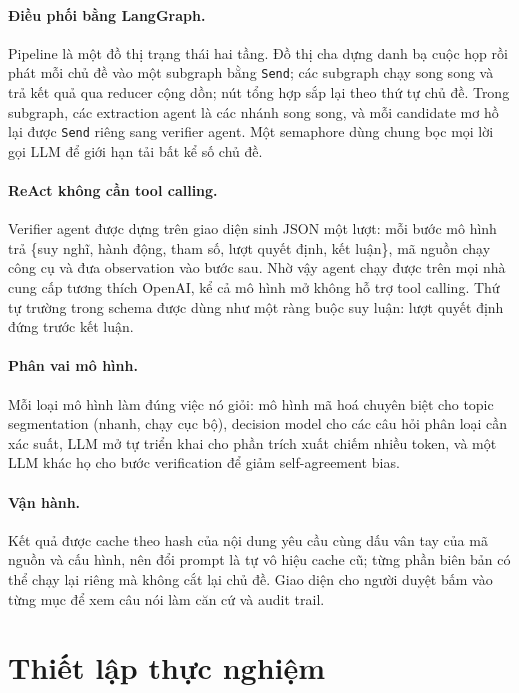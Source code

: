 \documentclass[11pt]{article}
\newcommand{\code}[1]{{\fontencoding{T1}\selectfont\texttt{#1}}}
\begin{document}
\paragraph{Điều phối bằng LangGraph.} Pipeline là một đồ thị trạng thái hai tầng. Đồ thị cha dựng danh
bạ cuộc họp rồi phát mỗi chủ đề vào một subgraph bằng \code{Send}; các subgraph chạy song song và trả
kết quả qua reducer cộng dồn; nút tổng hợp sắp lại theo thứ tự chủ đề. Trong subgraph, các extraction agent là các nhánh song song, và mỗi candidate mơ hồ lại được \code{Send} riêng sang verifier agent.
Một semaphore dùng chung bọc mọi lời gọi LLM để giới hạn tải bất kể số chủ đề.

\paragraph{ReAct không cần tool calling.} Verifier agent được dựng trên giao diện sinh JSON một lượt:
mỗi bước mô hình trả \{suy nghĩ, hành động, tham số, lượt quyết định, kết luận\}, mã nguồn chạy công cụ và
đưa observation vào bước sau. Nhờ vậy agent chạy được trên mọi nhà cung cấp tương thích OpenAI, kể cả
mô hình mở không hỗ trợ tool calling. Thứ tự trường trong schema được dùng như một ràng buộc suy luận:
lượt quyết định đứng trước kết luận.

\paragraph{Phân vai mô hình.} Mỗi loại mô hình làm đúng việc nó giỏi: mô hình mã hoá chuyên biệt cho topic segmentation (nhanh, chạy cục bộ), decision model cho các câu hỏi phân loại cần xác suất, LLM mở tự triển
khai cho phần trích xuất chiếm nhiều token, và một LLM khác họ cho bước verification để giảm self-agreement bias.

\paragraph{Vận hành.} Kết quả được cache theo hash của nội dung yêu cầu cùng dấu vân tay của mã nguồn và
cấu hình, nên đổi prompt là tự vô hiệu cache cũ; từng phần biên bản có thể chạy lại riêng mà không cắt lại
chủ đề. Giao diện cho người duyệt bấm vào từng mục để xem câu nói làm căn cứ và audit trail.

\section{Thiết lập thực nghiệm}
\end{document}
